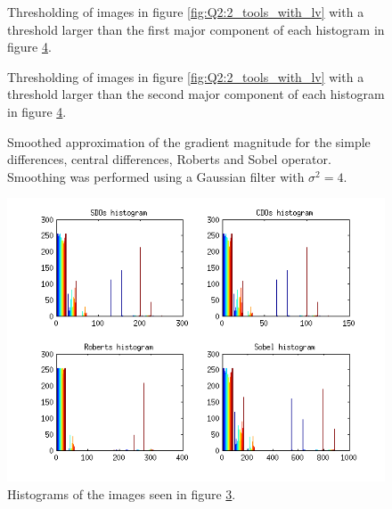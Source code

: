 \begin{figure}[H]
	\centering
	\scalebox{0.9}{}
	\caption{Thresholding of images in figure \ref{fig:Q2:2_tools_with_lv} with a threshold larger than the first major component of
	each histogram in figure \ref{fig:Q2:histogram_tools_with_lv}.}
	\label{fig:Q2:threshold_tools_1_with_lv}
\end{figure}

\begin{figure}[H]
	\centering
	\scalebox{0.9}{}
	\caption{Thresholding of images in figure \ref{fig:Q2:2_tools_with_lv} with a threshold larger than the second major component of
	each histogram in figure \ref{fig:Q2:histogram_tools_with_lv}.}
	\label{fig:Q2:threshold_tools_2_with_lv}
\end{figure}


\begin{figure}[H]
	\centering
	\scalebox{0.7}{}
	\caption{Smoothed approximation of the gradient magnitude for the simple differences, central differences, Roberts and Sobel operator. Smoothing
	was performed using a Gaussian filter with $\sigma^2 = 4$.}
	\label{fig:Q2:2_tools_smoothed_with_lv}
\end{figure}

\begin{figure}[H]
	\centering
	\includegraphics[scale=0.8]{./images/Q2/with_lv/tools_smoothed/histogram_1.png}
	\caption{Histograms of the images seen in figure \ref{fig:Q2:2_tools_smoothed_with_lv}.}
	\label{fig:Q2:histogram_tools_with_lv}
\end{figure}


